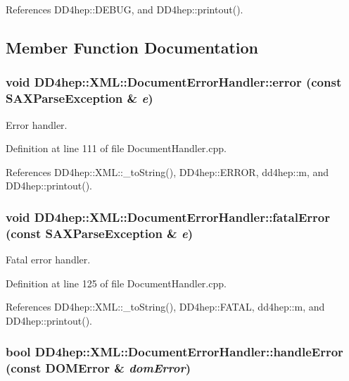 References DD4hep::DEBUG, and DD4hep::printout().

\subsection{Member Function Documentation}
\hypertarget{class_d_d4hep_1_1_x_m_l_1_1_document_error_handler_a1a39025b14996aa817e9f42da6076d30}{
\subsubsection[{error}]{\setlength{\rightskip}{0pt plus 5cm}void DD4hep::XML::DocumentErrorHandler::error (const SAXParseException \& {\em e})}}
\label{class_d_d4hep_1_1_x_m_l_1_1_document_error_handler_a1a39025b14996aa817e9f42da6076d30}


Error handler. 

Definition at line 111 of file DocumentHandler.cpp.

References DD4hep::XML::\_\-toString(), DD4hep::ERROR, dd4hep::m, and DD4hep::printout().\hypertarget{class_d_d4hep_1_1_x_m_l_1_1_document_error_handler_a2a765977361e8acb377a304c313bbcd3}{
\subsubsection[{fatalError}]{\setlength{\rightskip}{0pt plus 5cm}void DD4hep::XML::DocumentErrorHandler::fatalError (const SAXParseException \& {\em e})}}
\label{class_d_d4hep_1_1_x_m_l_1_1_document_error_handler_a2a765977361e8acb377a304c313bbcd3}


Fatal error handler. 

Definition at line 125 of file DocumentHandler.cpp.

References DD4hep::XML::\_\-toString(), DD4hep::FATAL, dd4hep::m, and DD4hep::printout().\hypertarget{class_d_d4hep_1_1_x_m_l_1_1_document_error_handler_a830b9a2a1ae3a2e35ae753b70ae18c52}{
\subsubsection[{handleError}]{\setlength{\rightskip}{0pt plus 5cm}bool DD4hep::XML::DocumentErrorHandler::handleError (const DOMError \& {\em domError})}}
\label{class_d_d4hep_1_1_x_m_l_1_1_document_error_handler_a830b9a2a1ae3a2e35ae753b70ae18c52}


